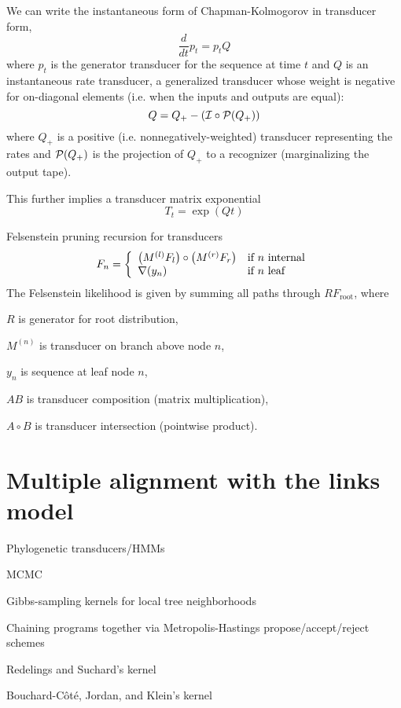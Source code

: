 \documentclass{beamer}
\begin{document}
\begin{frame}{}

We can write the instantaneous form of Chapman-Kolmogorov in transducer form,
\[
\frac{d}{dt} p_t = p_t Q
\]
where $p_t$ is the generator transducer for the sequence at time $t$
and $Q$ is an instantaneous rate transducer, a generalized transducer
whose weight is negative for on-diagonal elements (i.e. when the inputs and outputs are equal):
\[
Q = Q_{+} - ({\cal I} \circ {\cal P}(Q_{+}))
\]
where $Q_{+}$ is a positive (i.e. nonnegatively-weighted) transducer representing the rates
and ${\cal P}(Q_{+})$ is the projection of $Q_{+}$ to a recognizer
(marginalizing the output tape).

This further implies a transducer matrix exponential
\[
T_t = \exp(Qt)
\]

\end{frame}

\begin{frame}{}
Felsenstein pruning recursion for transducers
\[
F_n = \left\{
\begin{array}{ll}
\left( M^{(l)} F_l \right) \circ \left( M^{(r)} F_r \right) & \mbox{if $n$ internal} \\
\nabla(y_n) & \mbox{if $n$ leaf}
\end{array}
\right.
\]
The Felsenstein likelihood is given by summing all paths through $R F_{\mbox{root}}$,
where
\itemb
\item $R$ is generator for root distribution,
\item $M^{(n)}$ is transducer on branch above node $n$,
\item $y_n$ is sequence at leaf node $n$,
\item $AB$ is transducer composition (matrix multiplication),
\item $A \circ B$ is transducer intersection (pointwise product).
\iteme
\end{frame}


\section{Multiple alignment with the links model}

\begin{frame}{}

\itemb
\item Phylogenetic transducers/HMMs
\item MCMC
 \itemb
 \item Gibbs-sampling kernels for local tree neighborhoods
 \item Chaining programs together via Metropolis-Hastings propose/accept/reject schemes
 \item Redelings and Suchard's kernel
 \item Bouchard-C\^{o}t\'{e}, Jordan, and Klein's kernel
 \iteme
\iteme

\end{frame}
\end{document}
